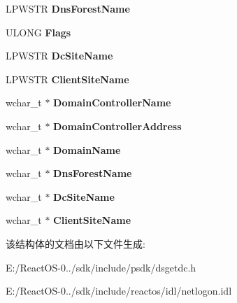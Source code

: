 \begin{DoxyCompactItemize}
L\+P\+W\+S\+TR {\bfseries Dns\+Forest\+Name}
\item 
\mbox{\label{struct___d_o_m_a_i_n___c_o_n_t_r_o_l_l_e_r___i_n_f_o_w_abdbd2f0abcad86efbabeaaf11668db14}} 
U\+L\+O\+NG {\bfseries Flags}
\item 
\mbox{\label{struct___d_o_m_a_i_n___c_o_n_t_r_o_l_l_e_r___i_n_f_o_w_ada243914462bc805b7f3ee8e4ae17844}} 
L\+P\+W\+S\+TR {\bfseries Dc\+Site\+Name}
\item 
\mbox{\label{struct___d_o_m_a_i_n___c_o_n_t_r_o_l_l_e_r___i_n_f_o_w_af2356a4d25334d8559696021cb1dda18}} 
L\+P\+W\+S\+TR {\bfseries Client\+Site\+Name}
\item 
\mbox{\label{struct___d_o_m_a_i_n___c_o_n_t_r_o_l_l_e_r___i_n_f_o_w_a012d2d4613b823f1800fede97369615f}} 
wchar\+\_\+t $\ast$ {\bfseries Domain\+Controller\+Name}
\item 
\mbox{\label{struct___d_o_m_a_i_n___c_o_n_t_r_o_l_l_e_r___i_n_f_o_w_a772cad4b3fb8a1be2e521658eeefc959}} 
wchar\+\_\+t $\ast$ {\bfseries Domain\+Controller\+Address}
\item 
\mbox{\label{struct___d_o_m_a_i_n___c_o_n_t_r_o_l_l_e_r___i_n_f_o_w_ac24852bad5ad2ed44f6a2d1309e81168}} 
wchar\+\_\+t $\ast$ {\bfseries Domain\+Name}
\item 
\mbox{\label{struct___d_o_m_a_i_n___c_o_n_t_r_o_l_l_e_r___i_n_f_o_w_a221c26ca8d57056514b1ce839d81ef49}} 
wchar\+\_\+t $\ast$ {\bfseries Dns\+Forest\+Name}
\item 
\mbox{\label{struct___d_o_m_a_i_n___c_o_n_t_r_o_l_l_e_r___i_n_f_o_w_ae5f3c03a6e8a43106e682c63b5f9521f}} 
wchar\+\_\+t $\ast$ {\bfseries Dc\+Site\+Name}
\item 
\mbox{\label{struct___d_o_m_a_i_n___c_o_n_t_r_o_l_l_e_r___i_n_f_o_w_a57fcf767edc412a0339d1d4724954855}} 
wchar\+\_\+t $\ast$ {\bfseries Client\+Site\+Name}
\end{DoxyCompactItemize}


该结构体的文档由以下文件生成\+:\begin{DoxyCompactItemize}
\item 
E\+:/\+React\+O\+S-\/0../sdk/include/psdk/dsgetdc.\+h\item 
E\+:/\+React\+O\+S-\/0../sdk/include/reactos/idl/netlogon.\+idl\end{DoxyCompactItemize}
